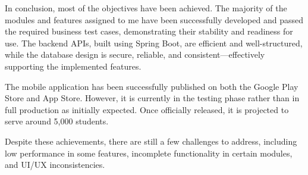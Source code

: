\begin{minipage}{\textwidth}
    \setlength{\parindent}{2em}
    In conclusion, most of the objectives have been achieved. The majority of the modules and features assigned to me have been successfully developed and passed the required business test cases, demonstrating their stability and readiness for use. The backend APIs, built using Spring Boot, are efficient and well-structured, while the database design is secure, reliable, and consistent—effectively supporting the implemented features.

    The mobile application has been successfully published on both the Google Play Store and App Store. However, it is currently in the testing phase rather than in full production as initially expected. Once officially released, it is projected to serve around 5,000 students.

    Despite these achievements, there are still a few challenges to address, including low performance in some features, incomplete functionality in certain modules, and UI/UX inconsistencies.
\end{minipage}\\




